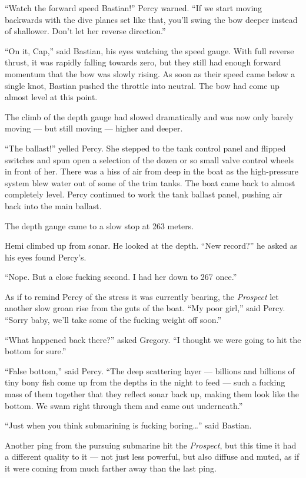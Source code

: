 \documentclass[
]{scrbook}
\begin{document}
``Watch the forward speed Bastian!'' Percy warned. ``If we start moving
backwards with the dive planes set like that, you'll swing the bow
deeper instead of shallower. Don't let her reverse direction.''

``On it, Cap,'' said Bastian, his eyes watching the speed gauge. With
full reverse thrust, it was rapidly falling towards zero, but they still
had enough forward momentum that the bow was slowly rising. As soon as
their speed came below a single knot, Bastian pushed the throttle into
neutral. The bow had come up almost level at this point.

The climb of the depth gauge had slowed dramatically and was now only
barely moving --- but still moving --- higher and deeper.

``The ballast!'' yelled Percy. She stepped to the tank control panel and
flipped switches and spun open a selection of the dozen or so small
valve control wheels in front of her. There was a hiss of air from deep
in the boat as the high-pressure system blew water out of some of the
trim tanks. The boat came back to almost completely level. Percy
continued to work the tank ballast panel, pushing air back into the main
ballast.

The depth gauge came to a slow stop at 263 meters.

Hemi climbed up from sonar. He looked at the depth. ``New record?'' he
asked as his eyes found Percy's.

``Nope. But a close fucking second. I had her down to 267 once.''

As if to remind Percy of the stress it was currently bearing, the
\emph{Prospect} let another slow groan rise from the guts of the boat.
``My poor girl,'' said Percy. ``Sorry baby, we'll take some of the
fucking weight off soon.''

``What happened back there?'' asked Gregory. ``I thought we were going
to hit the bottom for sure.''

``False bottom,'' said Percy. ``The deep scattering layer --- billions
and billions of tiny bony fish come up from the depths in the night to
feed --- such a fucking mass of them together that they reflect sonar
back up, making them look like the bottom. We swam right through them
and came out underneath.''

``Just when you think submarining is fucking boring\ldots{}'' said
Bastian.

Another ping from the pursuing submarine hit the \emph{Prospect}, but
this time it had a different quality to it --- not just less powerful,
but also diffuse and muted, as if it were coming from much farther away
than the last ping.
\end{document}
